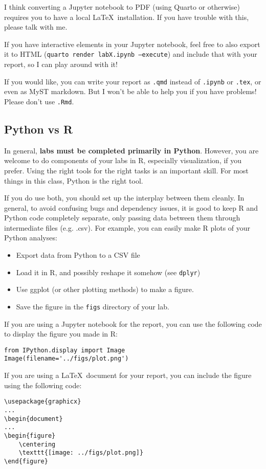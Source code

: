 \documentclass[letterpaper,12pt]{article}
\begin{document}
I think converting a Jupyter notebook to PDF (using Quarto or otherwise) requires you to have a local \LaTeX\ installation. If you have trouble with this, please talk with me.

If you have interactive elements in your Jupyter notebook, feel free to also export it to HTML (\texttt{quarto render labX.ipynb --execute}) and include that with your report, so I can play around with it!

If you would like, you can write your report as \texttt{.qmd} instead of \texttt{.ipynb} or \texttt{.tex}, or even as MyST markdown. But I won't be able to help you if you have problems! Please don't use \texttt{.Rmd}.

\subsection{Python vs R}
In general, \textbf{labs must be completed primarily in Python}. However, you are welcome to do components of your labs in R, especially visualization, if you prefer. Using the right tools for the right tasks is an important skill. For most things in this class, Python is the right tool.

If you do use both, you should set up the interplay between them cleanly. In general, to avoid confusing bugs and dependency issues, it is good to keep R and Python code completely separate, only passing data between them through intermediate files (e.g. .csv). For example, you can easily make R plots of your Python analyses:
\begin{itemize}
    \item Export data from Python to a CSV file
    \item Load it in R, and possibly reshape it somehow (see \texttt{dplyr})
    \item Use ggplot (or other plotting methods) to make a figure.
    \item Save the figure in the \texttt{figs} directory of your lab.
\end{itemize}
If you are using a Jupyter notebook for the report, you can use the following code to display the figure you made in R:
\begin{verbatim}
from IPython.display import Image
Image(filename='../figs/plot.png')
\end{verbatim}
If you are using a \LaTeX\ document for your report, you can include the figure using the following code:
\begin{verbatim}
\usepackage{graphicx}
...
\begin{document}
...
\begin{figure}
    \centering
    \texttt{[image: ../figs/plot.png]}
\end{figure}
\end{verbatim}
\end{document}
